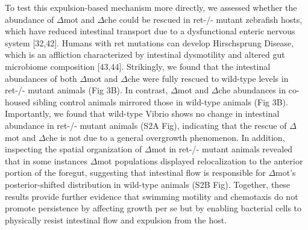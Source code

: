 To test this expulsion-based mechanism more directly, we assessed whether the abundance of $\Delta$mot and $\Delta$che could be rescued in ret-/- mutant zebrafish hosts, which have reduced intestinal transport due to a dysfunctional enteric nervous system [32,42]. Humans with ret mutations can develop Hirschsprung Disease, which is an affliction characterized by intestinal dysmotility and altered gut microbiome composition [43,44]. Strikingly, we found that the intestinal abundances of both $\Delta$mot and $\Delta$che were fully rescued to wild-type levels in ret-/- mutant animals (Fig 3B). In contrast, $\Delta$mot and $\Delta$che abundances in co-housed sibling control animals mirrored those in wild-type animals (Fig 3B). Importantly, we found that wild-type Vibrio shows no change in intestinal abundance in ret-/- mutant animals (S2A Fig), indicating that the rescue of $\Delta$mot and $\Delta$che is not due to a general overgrowth phenomenon. In addition, inspecting the spatial organization of $\Delta$mot in ret-/- mutant animals revealed that in some instances $\Delta$mot populations displayed relocalization to the anterior portion of the foregut, suggesting that intestinal flow is responsible for $\Delta$mot's posterior-shifted distribution in wild-type animals (S2B Fig). Together, these results provide further evidence that swimming motility and chemotaxis do not promote persistence by affecting growth per se but by enabling bacterial cells to physically resist intestinal flow and expulsion from the host. 


